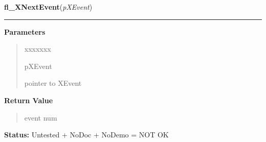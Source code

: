 \hspace{.8\funcindent}\begin{boxedminipage}{\funcwidth}

    \raggedright \textbf{fl\_XNextEvent}(\textit{pXEvent})

    \vspace{-1.5ex}

    \rule{\textwidth}{0.5\fboxrule}
\setlength{\parskip}{2ex}
\setlength{\parskip}{1ex}
      \textbf{Parameters}
      \vspace{-1ex}

      \begin{quote}
        \begin{Ventry}{xxxxxxx}

          \item[pXEvent]

          pointer to XEvent

        \end{Ventry}

      \end{quote}

      \textbf{Return Value}
    \vspace{-1ex}

      \begin{quote}
      event num

      \end{quote}

\textbf{Status:} Untested + NoDoc + NoDemo = NOT OK



    \end{boxedminipage}

    \label{xformslib:library:fl_XPeekEvent}

    \vspace{0.5ex}

